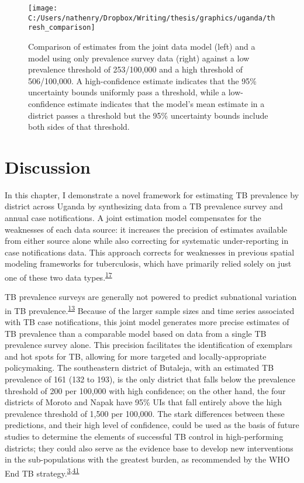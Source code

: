 \documentclass[
]{article}
\begin{document}
\begin{figure}[!ht]

{\centering \texttt{[image: C:/Users/nathenry/Dropbox/Writing/thesis/graphics/uganda/thresh\_comparison]} 

}

\caption{Comparison of estimates from the joint data model (left) and a model using only prevalence survey data (right) against a low prevalence threshold of 253/100,000 and a high threshold of 506/100,000. A high-confidence estimate indicates that the 95\% uncertainty bounds uniformly pass a threshold, while a low-confidence estimate indicates that the model's mean estimate in a district passes a threshold but the 95\% uncertainty bounds include both sides of that threshold.}\label{fig:thresh-comparison}
\end{figure}

\hypertarget{discussion}{%
\section{Discussion}\label{discussion}}

In this chapter, I demonstrate a novel framework for estimating TB prevalence by district across Uganda by synthesizing data from a TB prevalence survey and annual case notifications. A joint estimation model compensates for the weaknesses of each data source: it increases the precision of estimates available from either source alone while also correcting for systematic under-reporting in case notifications data. This approach corrects for weaknesses in previous spatial modeling frameworks for tuberculosis, which have primarily relied solely on just one of these two data types.\textsuperscript{\protect\hyperlink{ref-Shaweno2018}{17}}

TB prevalence surveys are generally not powered to predict subnational variation in TB prevalence.\textsuperscript{\protect\hyperlink{ref-Glaziou2008}{13}} Because of the larger sample sizes and time series associated with TB case notifications, this joint model generates more precise estimates of TB prevalence than a comparable model based on data from a single TB prevalence survey alone. This precision facilitates the identification of exemplars and hot spots for TB, allowing for more targeted and locally-appropriate policymaking. The southeastern district of Butaleja, with an estimated TB prevalence of 161 (132 to 193), is the only district that falls below the prevalence threshold of 200 per 100,000 with high confidence; on the other hand, the four districts of Moroto and Napak have 95\% UIs that fall entirely above the high prevalence threshold of 1,500 per 100,000. The stark differences between these predictions, and their high level of confidence, could be used as the basis of future studies to determine the elements of successful TB control in high-performing districts; they could also serve as the evidence base to develop new interventions in the sub-populations with the greatest burden, as recommended by the WHO End TB strategy.\textsuperscript{\protect\hyperlink{ref-WorldHealthOrganization2020a}{3},\protect\hyperlink{ref-Glaziou2018}{41}}
\end{document}
